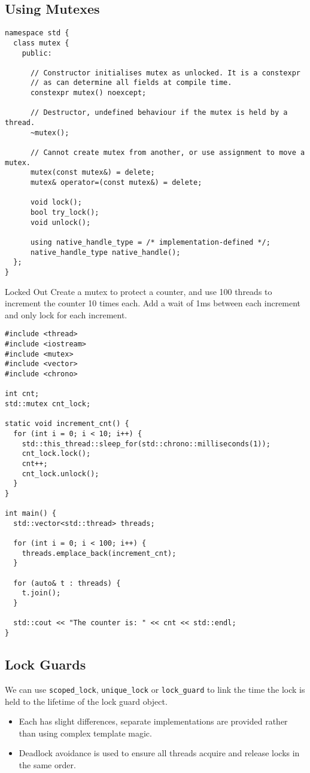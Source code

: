 \subsection{Using Mutexes}
\begin{verbatim}
namespace std {
  class mutex {
    public:

      // Constructor initialises mutex as unlocked. It is a constexpr 
      // as can determine all fields at compile time.
      constexpr mutex() noexcept;
      
      // Destructor, undefined behaviour if the mutex is held by a thread.
      ~mutex();

      // Cannot create mutex from another, or use assignment to move a mutex.
      mutex(const mutex&) = delete;
      mutex& operator=(const mutex&) = delete;
    
      void lock();
      bool try_lock();
      void unlock();
    
      using native_handle_type = /* implementation-defined */;
      native_handle_type native_handle();
  };
}
\end{verbatim}

\begin{examplebox}{Locked Out}
	Create a mutex to protect a counter, and use 100 threads to increment the counter 10 times each. Add a wait of 1ms between each increment and only lock for each increment.
	\tcblower
	\begin{verbatim}
#include <thread>
#include <iostream>
#include <mutex>
#include <vector>
#include <chrono>

int cnt;
std::mutex cnt_lock;

static void increment_cnt() {
  for (int i = 0; i < 10; i++) {
    std::this_thread::sleep_for(std::chrono::milliseconds(1));    
    cnt_lock.lock();
    cnt++;
    cnt_lock.unlock();
  }
}

int main() {
  std::vector<std::thread> threads;

  for (int i = 0; i < 100; i++) {
    threads.emplace_back(increment_cnt);
  }

  for (auto& t : threads) {
    t.join();
  }

  std::cout << "The counter is: " << cnt << std::endl;
}
  \end{verbatim}
\end{examplebox}

\subsection{Lock Guards}
We can use \texttt{scoped_lock}, \texttt{unique_lock} or \texttt{lock_guard} to link the time the lock is held to the lifetime of the lock guard object.
\begin{itemize}
	\item Each has slight differences, separate implementations are provided rather than using complex template magic.
	\item Deadlock avoidance is used to ensure all threads acquire and release locks in the same order.
\end{itemize}

